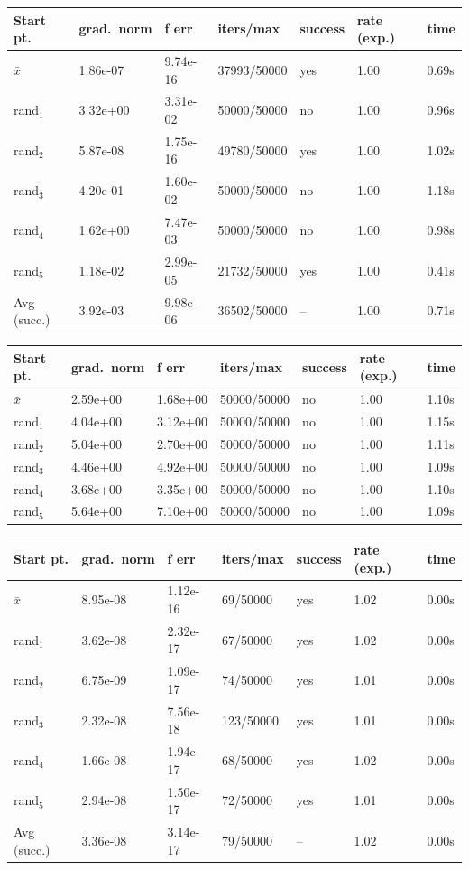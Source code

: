 \begin{tabular}{lllllll}
\toprule
Start pt. & grad.\ norm & f err & iters/max & success & rate (exp.) & time \\
\midrule
\(\bar{x}\) & 1.86e-07 & 9.74e-16 & 37993/50000 & yes & 1.00 & 0.69s \\
rand$_{1}$ & 3.32e+00 & 3.31e-02 & 50000/50000 & no & 1.00 & 0.96s \\
rand$_{2}$ & 5.87e-08 & 1.75e-16 & 49780/50000 & yes & 1.00 & 1.02s \\
rand$_{3}$ & 4.20e-01 & 1.60e-02 & 50000/50000 & no & 1.00 & 1.18s \\
rand$_{4}$ & 1.62e+00 & 7.47e-03 & 50000/50000 & no & 1.00 & 0.98s \\
rand$_{5}$ & 1.18e-02 & 2.99e-05 & 21732/50000 & yes & 1.00 & 0.41s \\
\midrule
Avg (succ.) & 3.92e-03 & 9.98e-06 & 36502/50000 & -- & 1.00 & 0.71s \\
\bottomrule
\end{tabular}

\begin{tabular}{lllllll}
\toprule
Start pt. & grad.\ norm & f err & iters/max & success & rate (exp.) & time \\
\midrule
\(\bar{x}\) & 2.59e+00 & 1.68e+00 & 50000/50000 & no & 1.00 & 1.10s \\
rand$_{1}$ & 4.04e+00 & 3.12e+00 & 50000/50000 & no & 1.00 & 1.15s \\
rand$_{2}$ & 5.04e+00 & 2.70e+00 & 50000/50000 & no & 1.00 & 1.11s \\
rand$_{3}$ & 4.46e+00 & 4.92e+00 & 50000/50000 & no & 1.00 & 1.09s \\
rand$_{4}$ & 3.68e+00 & 3.35e+00 & 50000/50000 & no & 1.00 & 1.10s \\
rand$_{5}$ & 5.64e+00 & 7.10e+00 & 50000/50000 & no & 1.00 & 1.09s \\
\bottomrule
\end{tabular}



\begin{tabular}{lllllll}
\toprule
Start pt. & grad.\ norm & f err & iters/max & success & rate (exp.) & time \\
\midrule
\(\bar{x}\) & 8.95e-08 & 1.12e-16 & 69/50000 & yes & 1.02 & 0.00s \\
rand$_{1}$ & 3.62e-08 & 2.32e-17 & 67/50000 & yes & 1.02 & 0.00s \\
rand$_{2}$ & 6.75e-09 & 1.09e-17 & 74/50000 & yes & 1.01 & 0.00s \\
rand$_{3}$ & 2.32e-08 & 7.56e-18 & 123/50000 & yes & 1.01 & 0.00s \\
rand$_{4}$ & 1.66e-08 & 1.94e-17 & 68/50000 & yes & 1.02 & 0.00s \\
rand$_{5}$ & 2.94e-08 & 1.50e-17 & 72/50000 & yes & 1.01 & 0.00s \\
\midrule
Avg (succ.) & 3.36e-08 & 3.14e-17 & 79/50000 & -- & 1.02 & 0.00s \\
\bottomrule
\end{tabular}

